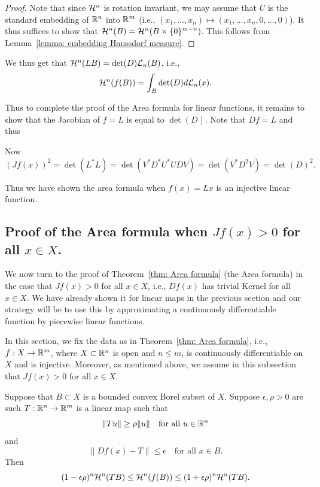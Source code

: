 \documentclass[twoside, a4paper, 10pt]{amsart}
\begin{document}
\begin{proof} Note that since $\mathcal{H}^n$ is rotation invariant, we may assume that $U$ is the standard embedding of $\mathbb{R}^n$ into $\mathbb{R}^m$ (i.e., $(x_1, \ldots, x_n) \mapsto (x_1, \ldots, x_n, 0, \ldots, 0)$). It thus suffices to show that $\mathcal{H}^n(B) = \mathcal{H}^n(B \times \{0\}^{m-n})$. This follows from Lemma~\ref{lemma: embedding Haussdorf measure}. \end{proof}

We thus get that $\mathcal{H}^n(LB) = \det(D)\mathcal{L}_n(B)$, i.e., $$\mathcal{H}^n(f(B)) = \int_B \det(D) d\mathcal{L}_n(x).$$

Thus to complete the proof of the Area formula for linear functions, it remains to show that the Jacobian of $f = L$ is equal to $\det(D)$. Note that $Df = L$ and thus

Now $$(Jf(x))^2 = \det(L^*L) = \det(V^*D^*U^*UDV) = \det(V^*D^2V) = \det(D)^2.$$

Thus we have shown the area formula when $f(x) = Lx$ is an injective linear function.

\subsection{Proof of the Area formula when $Jf(x) > 0$ for all $x \in X$.} We now turn to the proof of Theorem~\ref{thm: Area formula} (the Area formula) in the case that $Jf(x) > 0$ for all $x \in X$, i.e., $Df(x)$ has trivial Kernel for all $x \in X$. We have already shown it for linear maps in the previous section and our strategy will be to use this by approximating a continuously differentiable function by piecewise linear functions.

In this section, we fix the data as in Theorem~\ref{thm: Area formula}, i.e., $f:X \to \mathbb{R}^m$, where $X \subset \mathbb{R}^n$ is open and $n \leq m$, is continuously differentiable on $X$ and is injective. Moreover, as mentioned above, we assume in this subsection that $Jf(x)>0$ for all $x \in X$.

\begin{lemma}\label{lemma: Area formula main bound} Suppose that $B \subset X$ is a bounded convex Borel subset of $X$. Suppose $\epsilon, \rho >0$ are such $T:\mathbb{R}^n \to \mathbb{R}^m$ is a linear map such that 
$$\|Tu\| \geq \rho\|u\|\quad \text{for all } u \in \mathbb{R}^n$$ and 
$$\|Df(x) - T \| \leq \epsilon \quad \text{for all } x \in B.$$ Then 
$$(1-\epsilon \rho)^n \mathcal{H}^n(TB)\leq \mathcal{H}^n(f(B)) \leq (1+\epsilon \rho)^n \mathcal{H}^n(TB).$$

\end{lemma}
\end{document}
